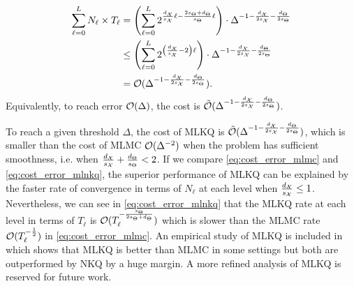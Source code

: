 \begin{align*}
    \sum_{\ell=0}^L N_\ell \times T_\ell &= \left( \sum_{\ell=0}^L 2^{ \frac{d_{\mathcal{X}}}{s_{\mathcal{X}}} \ell - \frac{2 s_\Theta + d_\Theta}{s_\Theta} \ell} \right) \cdot \Delta^{-1 - \frac{d_{\mathcal{X}}}{2s_{\mathcal{X}}} -\frac{d_\Theta}{2s_\Theta}} \\
    &\leq \left( \sum_{\ell=0}^L 2^{ \left(\frac{d_{\mathcal{X}}}{s_{\mathcal{X}}} - 2 \right) \ell} \right) \cdot \Delta^{-1 - \frac{d_{\mathcal{X}}}{2s_{\mathcal{X}}} -\frac{d_\Theta}{2s_\Theta}} \\
    &= \mathcal{O}(\Delta^{-1 - \frac{d_{\mathcal{X}}}{2s_{\mathcal{X}}} -\frac{d_\Theta}{2s_\Theta}}) .
\end{align*}
Equivalently, to reach error $\mathcal{O}(\Delta)$, the cost is $\tilde{\mathcal{O}}(\Delta^{-1 - \frac{d_{\mathcal{X}}}{2 s_{\mathcal{X}}} -\frac{d_\Theta}{2 s_\Theta}})$.
\begin{rem}\label{rem:mlnkq_mlmc}
    To reach a given threshold $\Delta$, 
    the cost of MLKQ is $\tilde{\mathcal{O}}(\Delta^{-1 - \frac{d_{\mathcal{X}}}{2 s_{\mathcal{X}}} -\frac{d_\Theta}{2 s_\Theta}})$, which is smaller than the cost of MLMC $\mathcal{O}(\Delta^{-2})$ when the problem has sufficient smoothness, i.e. when $\frac{d_{\mathcal{X}}}{s_{\mathcal{X}}} + \frac{d_\Theta}{s_\Theta} < 2$.  
    If we compare \eqref{eq:cost_error_mlmc} and \eqref{eq:cost_error_mlnkq}, the superior performance of MLKQ can be explained by the faster rate of convergence in terms of $N_\ell$ at each level when $\frac{d_{\mathcal{X}}}{s_{\mathcal{X}}} \leq 1$. 
    Nevertheless, we can see in \eqref{eq:cost_error_mlnkq} that the MLKQ rate at each level in terms of $T_\ell$ is $\mathcal{O}(T_\ell^{-\frac{s_\Theta}{2 s_\Theta +d_\Theta }})$ which is slower than the MLMC rate $\mathcal{O}(T_\ell^{-\frac{1}{2}})$ in \eqref{eq:cost_error_mlmc}.  
    An empirical study of MLKQ is included in  which shows that MLKQ is better than MLMC in some settings but both are outperformed by NKQ by a huge margin.
    A more refined analysis of MLKQ is reserved for future work.
\end{rem}

